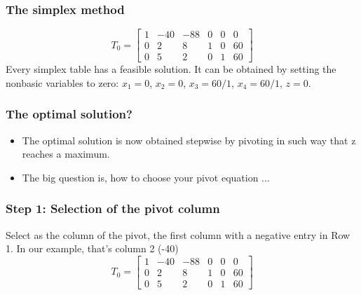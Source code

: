 
\begin{frame}
  \frametitle{The simplex method}
     \[
T_0 = \begin{bmatrix}
1 & -40 & -88 & 0 & 0 & 0\\ 
0 & 2 & 8 & 1 & 0 & 60\\
0 & 5 & 2 & 0 & 1 &60 
\end{bmatrix}
   \]
   Every simplex table has a feasible solution. It can be obtained by setting the nonbasic variables to zero: $x_1 = 0$, $x_2 = 0$, $x_3 = 60/1$, $x_4 = 60/1$, $z = 0$.
\end{frame}

\begin{frame}
  \frametitle{The optimal solution?}
  \begin{itemize}
    \item The optimal solution is now obtained stepwise by pivoting in such way that z reaches a maximum. 
    \item The big question is, how to choose your pivot equation ...
  \end{itemize}
\end{frame}

\begin{frame}
  \frametitle{Step 1: Selection of the pivot column}
  Select as the column of the pivot, the first column with a negative entry in Row 1. In our example, that’s column 2 (-40)
     \[
T_0 = \begin{bmatrix}
1 & -40 & -88 & 0 & 0 & 0\\ 
0 & 2 & 8 & 1 & 0 & 60\\
0 & 5 & 2 & 0 & 1 &60 
\end{bmatrix}
   \]
\end{frame}

